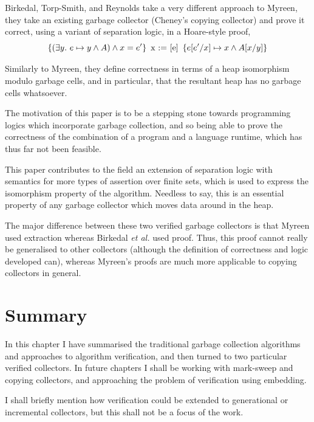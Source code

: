 Birkedal, Torp-Smith, and Reynolds\cite{Birkedal04} take a very
different approach to Myreen, they take an existing \gls{garbage
  collector} (Cheney's copying collector) and prove it correct, using
a variant of separation logic, in a Hoare-style
proof, \[\left\{(\exists y.\ e \mapsto y \land A) \land x = e'\right\}\ \mbox{x :=
[e]}\ \left\{e[e'/x] \mapsto x \land A[x/y]\right\}\]

Similarly to Myreen, they define correctness in terms of a heap
isomorphism modulo garbage cells, and in particular, that the
resultant heap has no garbage cells whatsoever.

The motivation of this paper is to be a stepping stone towards
programming logics which incorporate \gls{garbage collection}, and so
being able to prove the correctness of the combination of a program
and a language runtime, which has thus far not been feasible.

This paper contributes to the field an extension of separation logic
with semantics for more types of assertion over finite sets, which is
used to express the isomorphism property of the algorithm. Needless to
say, this is an essential property of any garbage collector which
moves data around in the heap.

The major difference between these two verified garbage collectors is
that Myreen used extraction whereas Birkedal \textit{et al.} used
proof. Thus, this proof cannot really be generalised to other
collectors (although the definition of correctness and logic developed
can), whereas Myreen's proofs are much more applicable to copying
collectors in general.

\section{Summary}
\label{sec:lit-summary}

In this chapter I have summarised the traditional \gls{garbage collection}
algorithms and approaches to \gls{algorithm verification}, and then turned
to two particular verified \glspl{collector}. In future chapters I shall be
working with \gls{mark-sweep} and \gls{copying} \glspl{collector}, and
approaching the problem of verification using embedding.

I shall briefly mention how verification could be extended to
generational or incremental collectors, but this shall not be a focus
of the work.
